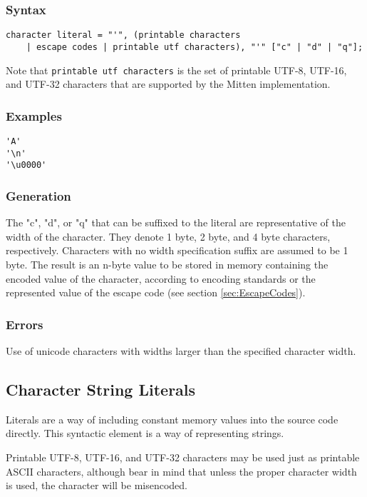 \documentclass[10pt,a4paper]{article}
\begin{document}
\subsubsection{Syntax}
\begin{verbatim}
character literal = "'", (printable characters
    | escape codes | printable utf characters), "'" ["c" | "d" | "q"];
\end{verbatim}

Note that \verb|printable utf characters| is the set of printable UTF-8, UTF-16, and UTF-32 characters that are supported by the Mitten implementation. 

\subsubsection{Examples}
\begin{verbatim}
'A'
'\n'
'\u0000'
\end{verbatim}

\subsubsection{Generation}
The "c", "d", or "q" that can be suffixed to the literal are representative of the width of the character. They denote 1 byte, 2 byte, and 4 byte characters, respectively. Characters with no width specification suffix are assumed to be 1 byte. The result is an n-byte value to be stored in memory containing the encoded value of the character, according to encoding standards or the represented value of the escape code (see section \ref{sec:EscapeCodes}).

\subsubsection{Errors}
Use of unicode characters with widths larger than the specified character width.

\newpage




\subsection{Character String Literals}
\label{sec:CharacterStringLiterals}
Literals are a way of including constant memory values into the source code directly. This syntactic element is a way of representing strings.

Printable UTF-8, UTF-16, and UTF-32 characters may be used just as printable ASCII characters, although bear in mind that unless the proper character width is used, the character will be misencoded.
\end{document}
